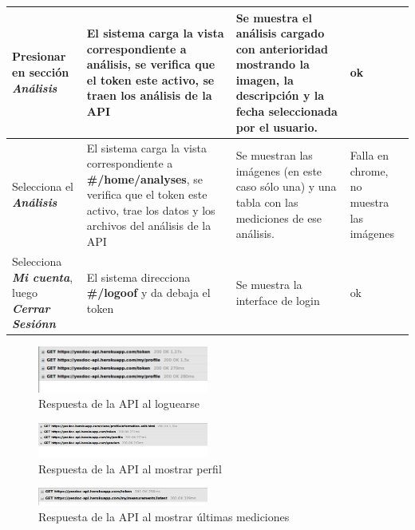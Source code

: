\documentclass[a4paper,12pt]{article}
\begin{document}
\begin{longtable}{|p{4cm}|p{4cm}|p{4cm}|p{3cm}|}
Presionar en sección \textit{\textbf{Análisis }} 
& El sistema carga la vista correspondiente a análisis, se verifica que el token este activo, se traen los análisis de la API
& Se muestra el análisis cargado con anterioridad mostrando la imagen, la descripción y la fecha seleccionada por el usuario.
& ok
\\ \hline






Selecciona el \textit{\textbf{Análisis}}
& El sistema carga la vista correspondiente a \textbf{ \#/home/analyses}, se verifica que el token este activo, trae los datos y los archivos del análisis de la API
& Se muestran las imágenes (en este caso sólo una) y una tabla con las mediciones de ese análisis.
& Falla en chrome, no muestra las imágenes
\\ \hline




Selecciona \textit{\textbf{Mi cuenta}}, luego \textit{\textbf{Cerrar Sesiónn}}
& El sistema direcciona \textbf{\#/logoof }y da debaja el token
& Se muestra la interface de login
& ok
\\ \hline


\end{longtable}







    \begin{figure}[h]
        \centering
        \includegraphics[width=0.5\textwidth]{img/5-login}
        \caption{Respuesta de la API al loguearse}
		\label{5-login}
    \end{figure}
    
        \begin{figure}[h]
        \centering
        \includegraphics[width=0.5\textwidth]{img/5-perfil}
        \caption{Respuesta de la API al mostrar perfil}
		\label{5-perfil}
    \end{figure}
    
        \begin{figure}[h]
        \centering
        \includegraphics[width=0.5\textwidth]{img/5-resumen}
        \caption{Respuesta de la API al mostrar últimas mediciones}
		\label{5-resumen}
    \end{figure}
    
\end{document}
